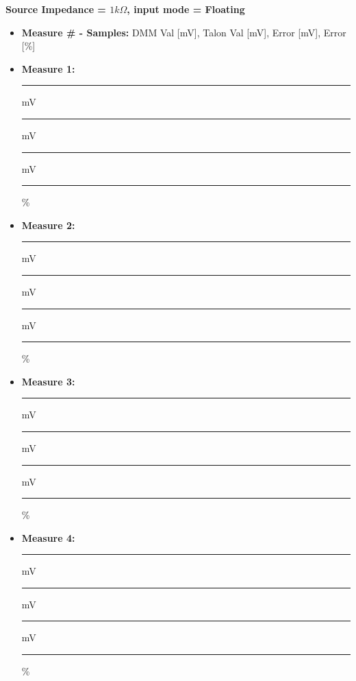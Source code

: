 \textbf{Source Impedance = $1k\Omega$, input mode = Floating}
\begin{itemize}
\item \textbf{Measure \# - Samples:} DMM Val [mV], Talon Val [mV], Error [mV], Error [\%]
\item \textbf{Measure 1:} \rule{1.5cm}{0.15mm} mV \hspace{0.5cm} \rule{1.5cm}{0.15mm} mV \hspace{0.5cm} \rule{1.5cm}{0.15mm} mV \hspace{0.5cm} \rule{1.5cm}{0.15mm} \%
\item \textbf{Measure 2:} \rule{1.5cm}{0.15mm} mV \hspace{0.5cm} \rule{1.5cm}{0.15mm} mV \hspace{0.5cm} \rule{1.5cm}{0.15mm} mV \hspace{0.5cm} \rule{1.5cm}{0.15mm} \%
\item \textbf{Measure 3:} \rule{1.5cm}{0.15mm} mV \hspace{0.5cm} \rule{1.5cm}{0.15mm} mV \hspace{0.5cm} \rule{1.5cm}{0.15mm} mV \hspace{0.5cm} \rule{1.5cm}{0.15mm} \%
\item \textbf{Measure 4:} \rule{1.5cm}{0.15mm} mV \hspace{0.5cm} \rule{1.5cm}{0.15mm} mV \hspace{0.5cm} \rule{1.5cm}{0.15mm} mV \hspace{0.5cm} \rule{1.5cm}{0.15mm} \%
\end{itemize}

